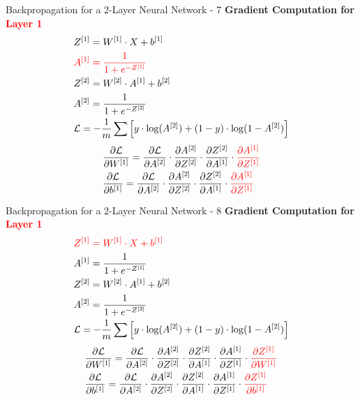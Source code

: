 \documentclass[aspectratio=169]{beamer}
\begin{document}
%
%
\begin{frame}{Backpropagation for a 2-Layer Neural Network - 7}
\textbf{Gradient Computation for \textcolor{red}{Layer 1}}
\begin{align*}
&Z^{[1]} = W^{[1]} \cdot X + b^{[1]}\\
&\textcolor{red}{A^{[1]} = \frac{1}{1 + e^{-Z^{[1]}}}}      \\
&Z^{[2]} = W^{[2]} \cdot A^{[1]} + b^{[2]} \\
&A^{[2]} = \frac{1}{1 + e^{-Z^{[2]}}} \\
&\mathcal{L} = -\frac{1}{m} \sum \left[ y \cdot \log(A^{[2]}) + (1 - y) \cdot \log(1 - A^{[2]}) \right]
\end{align*}
\begin{align*}
&\frac{\partial \mathcal{L}}{\partial W^{[1]}} = \frac{\partial \mathcal{L}}{\partial A^{[2]}} \cdot \frac{\partial A^{[2]}}{\partial Z^{[2]}} \cdot \frac{\partial Z^{[2]}}{\partial A^{[1]}} \cdot \textcolor{red}{\frac{\partial A^{[1]}}{\partial Z^{[1]}}} 
\\
&\frac{\partial \mathcal{L}}{\partial b^{[1]}} = \frac{\partial \mathcal{L}}{\partial A^{[2]}} \cdot \frac{\partial A^{[2]}}{\partial Z^{[2]}} \cdot \frac{\partial Z^{[2]}}{\partial A^{[1]}} \cdot \textcolor{red}{\frac{\partial A^{[1]}}{\partial Z^{[1]}}} 
\end{align*}
\end{frame}
%
%
\begin{frame}{Backpropagation for a 2-Layer Neural Network - 8}
\textbf{Gradient Computation for \textcolor{red}{Layer 1}}
\begin{align*}
&\textcolor{red}{Z^{[1]} = W^{[1]} \cdot X + b^{[1]}}\\
&A^{[1]} = \frac{1}{1 + e^{-Z^{[1]}}}      \\
&Z^{[2]} = W^{[2]} \cdot A^{[1]} + b^{[2]} \\
&A^{[2]} = \frac{1}{1 + e^{-Z^{[2]}}} \\
&\mathcal{L} = -\frac{1}{m} \sum \left[ y \cdot \log(A^{[2]}) + (1 - y) \cdot \log(1 - A^{[2]}) \right]
\end{align*}
\begin{align*}
&\frac{\partial \mathcal{L}}{\partial W^{[1]}} = \frac{\partial \mathcal{L}}{\partial A^{[2]}} \cdot \frac{\partial A^{[2]}}{\partial Z^{[2]}} \cdot \frac{\partial Z^{[2]}}{\partial A^{[1]}} \cdot \frac{\partial A^{[1]}}{\partial Z^{[1]}} \cdot \textcolor{red}{\frac{\partial Z^{[1]}}{\partial W^{[1]}}}
\\
&\frac{\partial \mathcal{L}}{\partial b^{[1]}} = \frac{\partial \mathcal{L}}{\partial A^{[2]}} \cdot \frac{\partial A^{[2]}}{\partial Z^{[2]}} \cdot \frac{\partial Z^{[2]}}{\partial A^{[1]}} \cdot \frac{\partial A^{[1]}}{\partial Z^{[1]}} \cdot \textcolor{red}{\frac{\partial Z^{[1]}}{\partial b^{[1]}}}
\end{align*}
\end{frame}
\end{document}
